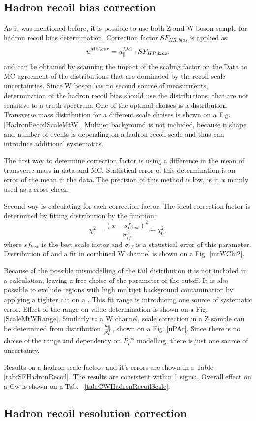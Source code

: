 \subsection{Hadron recoil bias correction}


As it was mentioned before, it is possible to use both Z and W boson sample for hadron recoil bias determination. Correction factor $SF_{HR,bias}$ is applied as:
\begin{equation}
u_{\parallel}^{MC,cor}=u_{\parallel}^{MC} \cdot SF_{HR,bias},
\end{equation}
and can be obtained by scanning the impact of the scaling factor on the Data to MC agreement of the distributions that are dominated by the recoil scale uncertainties. Since W boson has no second source of \ptw measurments, determination of the hadron recoil bias should use the distributions, that  are not sensitive to a truth \ptw spectrum.  One of the optimal choises is a \mtw distribution. Transverse mass distribution for a different scale choises is shown on a Fig. \ref{HadronRecoilScaleMtW}. Multijet background is not included, because it shape and number of events is depending on a hadron recoil scale and thus can introduce additional systematics.

The first way to determine correction factor is using a difference in the mean of transverse mass in data and MC. Statistical error of this determination is an error of the mean in the data. The precision of this method is low, is it is mainly used as a cross-check. 

Second way is calculating \chiD for each correction factor. The ideal correction factor is determined by fitting \chiD distribution by the function:
\begin{equation}
\chi^2 = \frac{(x-sf_{best})^2}{\sigma_{sf}^2}+\chi^2_0,
\end{equation}
where $sf_{best}$ is the best scale factor and $\sigma_{sf}$ is a statistical error of this parameter. Distribution of \chiD and a fit in combined W channel is shown on a Fig. \ref{mtWChi2}.

Because of the possible mismodelling of the tail \mtw distribution it is not included in a \chiD calculation, leaving a free choise of the parameter of the cutoff.  It is also possible to exclude regions with high multijet background contamination by applying a tighter cut on a \mtw. 
This fit range is introducing one source of systematic error. Effect of the range on value determination is shown on a Fig. \ref{ScaleMtWRange}. 
Similarly to a W channel, scale correction in a Z sample can be determined from distribution $\frac{u_{\parallel}}{p_T^{ll}}$, shown on a Fig. \ref{uPAr}. 
Since there is no choise of the range and dependency on $P_T^{bos}$ modelling, there is just one source of uncertainty.
  
Results on a hadron scale factros and it's errors are shown in a Table \ref{tab:SFHadronRecoil}. The results are consistent within 1 sigma. Overall effect on a Cw is shown on a Tab. ~\ref{tab:CWHadronRecoilScale}.


\subsection{Hadron recoil resolution correction}

